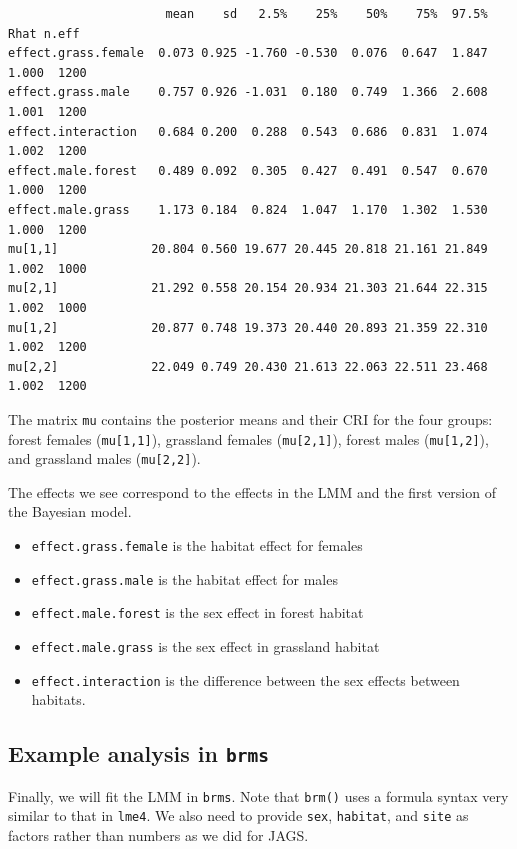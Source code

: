 \documentclass[
  13,
  letterpaper,
]{report}
\providecommand{\tightlist}{%
  \setlength{\itemsep}{0pt}\setlength{\parskip}{0pt}}
\begin{document}
\begin{verbatim}
                      mean    sd   2.5%    25%    50%    75%  97.5%  Rhat n.eff
effect.grass.female  0.073 0.925 -1.760 -0.530  0.076  0.647  1.847 1.000  1200
effect.grass.male    0.757 0.926 -1.031  0.180  0.749  1.366  2.608 1.001  1200
effect.interaction   0.684 0.200  0.288  0.543  0.686  0.831  1.074 1.002  1200
effect.male.forest   0.489 0.092  0.305  0.427  0.491  0.547  0.670 1.000  1200
effect.male.grass    1.173 0.184  0.824  1.047  1.170  1.302  1.530 1.000  1200
mu[1,1]             20.804 0.560 19.677 20.445 20.818 21.161 21.849 1.002  1000
mu[2,1]             21.292 0.558 20.154 20.934 21.303 21.644 22.315 1.002  1000
mu[1,2]             20.877 0.748 19.373 20.440 20.893 21.359 22.310 1.002  1200
mu[2,2]             22.049 0.749 20.430 21.613 22.063 22.511 23.468 1.002  1200
\end{verbatim}

The matrix \texttt{mu} contains the posterior means and their CRI for
the four groups: forest females (\texttt{mu{[}1,1{]}}), grassland
females (\texttt{mu{[}2,1{]}}), forest males (\texttt{mu{[}1,2{]}}), and
grassland males (\texttt{mu{[}2,2{]}}).

The effects we see correspond to the effects in the LMM and the first
version of the Bayesian model.

\begin{itemize}
\tightlist
\item
  \texttt{effect.grass.female} is the habitat effect for females
\item
  \texttt{effect.grass.male} is the habitat effect for males
\item
  \texttt{effect.male.forest} is the sex effect in forest habitat
\item
  \texttt{effect.male.grass} is the sex effect in grassland habitat
\item
  \texttt{effect.interaction} is the difference between the sex effects
  between habitats.
\end{itemize}

\subsection{\texorpdfstring{Example analysis in
\texttt{brms}}{Example analysis in brms}}\label{sec-mixed-lmm-brms}

Finally, we will fit the LMM in \texttt{brms}. Note that \texttt{brm()}
uses a formula syntax very similar to that in \texttt{lme4}. We also
need to provide \texttt{sex}, \texttt{habitat}, and \texttt{site} as
factors rather than numbers as we did for JAGS.
\end{document}
